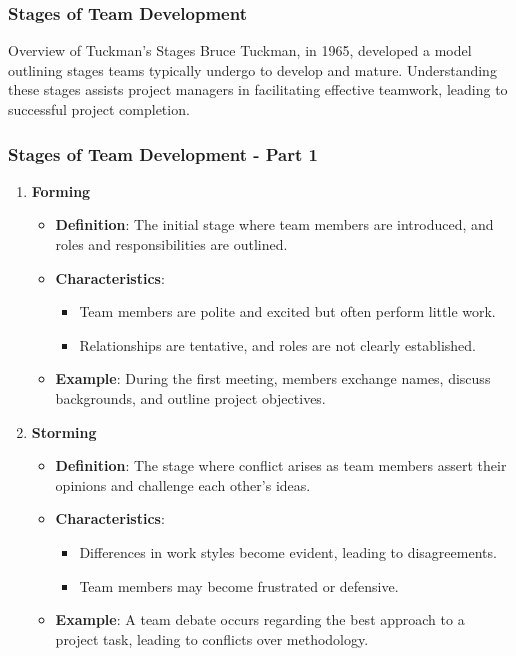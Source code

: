 \documentclass[aspectratio=169]{beamer}
\begin{document}
\begin{frame}[fragile]
    \frametitle{Stages of Team Development}
    \begin{block}{Overview of Tuckman's Stages}
        Bruce Tuckman, in 1965, developed a model outlining stages teams typically undergo to develop and mature. Understanding these stages assists project managers in facilitating effective teamwork, leading to successful project completion.
    \end{block}
\end{frame}

\begin{frame}[fragile]
    \frametitle{Stages of Team Development - Part 1}
    \begin{enumerate}
        \item \textbf{Forming}
            \begin{itemize}
                \item \textbf{Definition}: The initial stage where team members are introduced, and roles and responsibilities are outlined.
                \item \textbf{Characteristics}:
                    \begin{itemize}
                        \item Team members are polite and excited but often perform little work.
                        \item Relationships are tentative, and roles are not clearly established.
                    \end{itemize}
                \item \textbf{Example}: During the first meeting, members exchange names, discuss backgrounds, and outline project objectives.
            \end{itemize}
        \item \textbf{Storming}
            \begin{itemize}
                \item \textbf{Definition}: The stage where conflict arises as team members assert their opinions and challenge each other's ideas.
                \item \textbf{Characteristics}:
                    \begin{itemize}
                        \item Differences in work styles become evident, leading to disagreements.
                        \item Team members may become frustrated or defensive.
                    \end{itemize}
                \item \textbf{Example}: A team debate occurs regarding the best approach to a project task, leading to conflicts over methodology.
            \end{itemize}
    \end{enumerate}
\end{frame}
\end{document}
